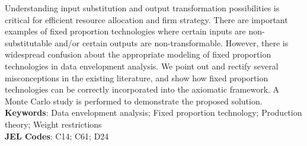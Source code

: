 \noindent 
Understanding input substitution and output transformation possibilities is critical for efficient resource allocation and firm strategy. There are important examples of fixed proportion technologies where certain inputs are non-substitutable and/or certain outputs are non-transformable. However, there is widespread confusion about the appropriate modeling of fixed proportion technologies in data envelopment analysis. We point out and rectify several misconceptions in the existing literature, and show how fixed proportion technologies can be correctly incorporated into the axiomatic framework. A Monte Carlo study is performed to demonstrate the proposed solution.
\\[5mm]
\textbf{Keywords}: Data envelopment analysis; Fixed proportion technology; Production theory; Weight restrictions
\\[2mm]
\textbf{JEL Codes}: C14; C61; D24